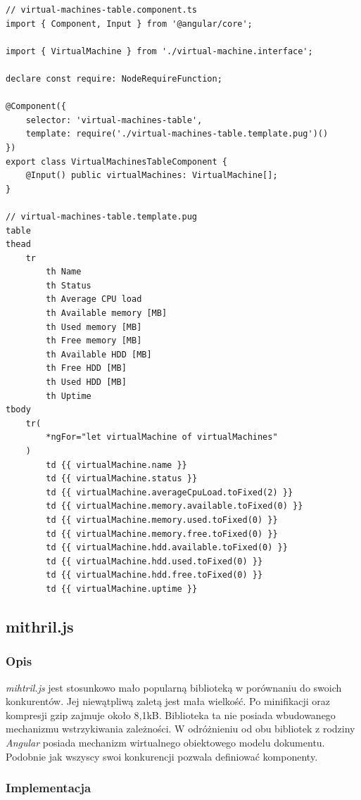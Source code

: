 \documentclass[polish, twoside, 12pt]{mwart}
\begin{document}
\begin{lstlisting}[caption=Komponent tabeli]
// virtual-machines-table.component.ts
import { Component, Input } from '@angular/core';

import { VirtualMachine } from './virtual-machine.interface';

declare const require: NodeRequireFunction;

@Component({
    selector: 'virtual-machines-table',
    template: require('./virtual-machines-table.template.pug')()
})
export class VirtualMachinesTableComponent {
    @Input() public virtualMachines: VirtualMachine[];
}

// virtual-machines-table.template.pug
table
thead
    tr
        th Name
        th Status
        th Average CPU load
        th Available memory [MB]
        th Used memory [MB]
        th Free memory [MB]
        th Available HDD [MB]
        th Free HDD [MB]
        th Used HDD [MB]
        th Uptime
tbody
    tr(
        *ngFor="let virtualMachine of virtualMachines"
    )
        td {{ virtualMachine.name }}
        td {{ virtualMachine.status }}
        td {{ virtualMachine.averageCpuLoad.toFixed(2) }}
        td {{ virtualMachine.memory.available.toFixed(0) }}
        td {{ virtualMachine.memory.used.toFixed(0) }}
        td {{ virtualMachine.memory.free.toFixed(0) }}
        td {{ virtualMachine.hdd.available.toFixed(0) }}
        td {{ virtualMachine.hdd.used.toFixed(0) }}
        td {{ virtualMachine.hdd.free.toFixed(0) }}
        td {{ virtualMachine.uptime }}
\end{lstlisting}

\subsection{mithril.js}

\subsubsection{Opis}

\emph{mihtril.js} jest stosunkowo mało popularną biblioteką w porównaniu do swoich konkurentów. Jej niewątpliwą zaletą jest mała wielkość. Po minifikacji oraz kompresji gzip zajmuje około 8,1kB. Biblioteka ta nie posiada wbudowanego mechanizmu wstrzykiwania zależności. W odróżnieniu od obu bibliotek z rodziny \emph{Angular} posiada mechanizm wirtualnego obiektowego modelu dokumentu. Podobnie jak wszyscy swoi konkurencji pozwala definiować komponenty.

\subsubsection{Implementacja}
\end{document}
